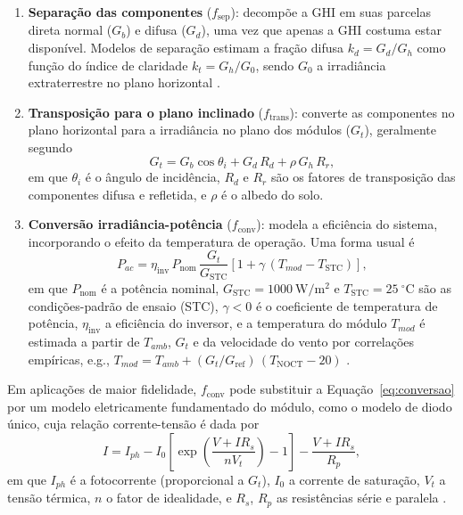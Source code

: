 \begin{enumerate}
    \item \textbf{Separação das componentes} ($f_{\mathrm{sep}}$): decompõe a GHI em suas
    parcelas direta normal ($G_{b}$) e difusa ($G_{d}$), uma vez que apenas a GHI costuma
    estar disponível. Modelos de separação estimam a fração difusa $k_{d} = G_{d}/G_{h}$
    como função do índice de claridade $k_{t} = G_{h}/G_{0}$, sendo $G_{0}$ a irradiância
    extraterrestre no plano horizontal \cite{Markovics2022}.

    \item \textbf{Transposição para o plano inclinado} ($f_{\mathrm{trans}}$): converte as
    componentes no plano horizontal para a irradiância no plano dos módulos ($G_{t}$),
    geralmente segundo
    \begin{equation}
        G_{t} = G_{b}\cos\theta_{i} + G_{d}\,R_{d} + \rho\,G_{h}\,R_{r},
        \label{eq:transposicao}
    \end{equation}
    em que $\theta_{i}$ é o ângulo de incidência, $R_{d}$ e $R_{r}$ são os fatores de
    transposição das componentes difusa e refletida, e $\rho$ é o albedo do solo.

    \item \textbf{Conversão irradiância-potência} ($f_{\mathrm{conv}}$): modela a eficiência
    do sistema, incorporando o efeito da temperatura de operação. Uma forma usual é
    \begin{equation}
        P_{ac} = \eta_{\mathrm{inv}}\,P_{\mathrm{nom}}\,\frac{G_{t}}{G_{\mathrm{STC}}}
        \left[1 + \gamma\,(T_{mod} - T_{\mathrm{STC}})\right],
        \label{eq:conversao}
    \end{equation}
    em que $P_{\mathrm{nom}}$ é a potência nominal, $G_{\mathrm{STC}} = 1000~\mathrm{W/m^2}$
    e $T_{\mathrm{STC}} = 25~^{\circ}\mathrm{C}$ são as condições-padrão de ensaio (STC),
    $\gamma < 0$ é o coeficiente de temperatura de potência, $\eta_{\mathrm{inv}}$ a
    eficiência do inversor, e a temperatura do módulo $T_{mod}$ é estimada a partir de
    $T_{amb}$, $G_{t}$ e da velocidade do vento por correlações empíricas, e.g.,
    $T_{mod} = T_{amb} + (G_{t}/G_{\mathrm{ref}})\,(T_{\mathrm{NOCT}} - 20)$
    \cite{Sohani2022}.
\end{enumerate}

Em aplicações de maior fidelidade, $f_{\mathrm{conv}}$ pode substituir a
Equação~\eqref{eq:conversao} por um modelo eletricamente fundamentado do módulo, como o
modelo de diodo único, cuja relação corrente-tensão é dada por
\begin{equation}
    I = I_{ph} - I_{0}\left[\exp\!\left(\frac{V + I R_{s}}{n V_{t}}\right) - 1\right]
    - \frac{V + I R_{s}}{R_{p}},
    \label{eq:diodo}
\end{equation}
em que $I_{ph}$ é a fotocorrente (proporcional a $G_{t}$), $I_{0}$ a corrente de saturação,
$V_{t}$ a tensão térmica, $n$ o fator de idealidade, e $R_{s}$, $R_{p}$ as resistências
série e paralela \cite{Sohani2022}.

